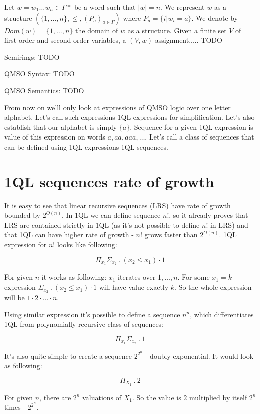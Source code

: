 \documentclass[12pt]{article}
\theoremstyle{definition}
\begin{document}
Let $w = w_1\ldots w_n \in \Gamma*$ be a word such that $|w| = n$. We represent $w$ as a structure $(\{1,\ldots,n\}, \leq, (P_a)_{a \in \Gamma})$ where $P_a = \{i | w_i = a\}$. We denote by $Dom(w) = \{1,\ldots,n\}$ the domain of $w$ as a structure. Given a finite set $V$ of first-order and second-order variables, a $(V, w)$-assignment..... TODO

Semirings: TODO

QMSO Syntax: TODO

QMSO Semantics: TODO

From now on we'll only look at expressions of QMSO logic over one letter alphabet. Let's call such expressions 1QL expressions for simplification. Let's also establish that our alphabet is simply $\{a\}$. Sequence for a given 1QL expression is value of this expression on words $a, aa, aaa, \ldots$. Let's call a class of sequences that can be defined using 1QL expressions 1QL sequences.

\section{1QL sequences rate of growth}
It is easy to see that linear recursive sequences (LRS) have rate of growth bounded by $2^{O(n)}$. In 1QL we can define sequence $n!$, so it already proves that LRS are contained strictly in 1QL (as it's not possible to define $n!$ in LRS) and that 1QL can have higher rate of growth - $n!$ grows faster than $2^{O(n)}$. 1QL expression for $n!$ looks like following:

$$\Pi_{x_1}\Sigma_{x_2} \ . \ (x_2 \leq x_1) \cdot 1$$

For given $n$ it works as following: $x_1$ iterates over $1,\ldots,n$. For some $x_1 = k$ expression $\Sigma_{x_2} \ . \ (x_2 \leq x_1) \cdot 1$ will have value exactly $k$. So the whole expression will be $1 \cdot 2 \cdot \ldots \cdot n$.

Using similar expression it's possible to define a sequence $n^n$, which differentiates 1QL from polynomially recursive class of sequences:

$$\Pi_{x_1}\Sigma_{x_2} \ . \ 1$$

It's also quite simple to create a sequence $2^{2^n}$ - doubly exponential. It would look as following:

$$\Pi_{X_1} \ . \ 2$$

For given $n$, there are $2^n$ valuations of $X_1$. So the value is $2$ multiplied by itself $2^n$ times - $2^{2^n}$.
\end{document}
